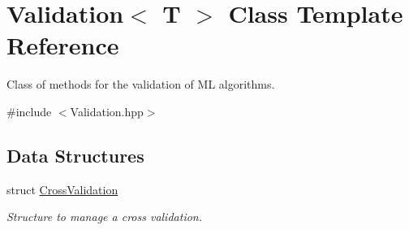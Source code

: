 \hypertarget{class_validation}{}\section{Validation$<$ T $>$ Class Template Reference}
\label{class_validation}


Class of methods for the validation of ML algorithms.  




{\ttfamily \#include $<$Validation.\+hpp$>$}

\subsection*{Data Structures}
\begin{DoxyCompactItemize}
\item 
struct \mbox{\hyperlink{struct_validation_1_1_cross_validation}{Cross\+Validation}}
\begin{DoxyCompactList}\small\item\em Structure to manage a cross validation. \end{DoxyCompactList}\end{DoxyCompactItemize}
